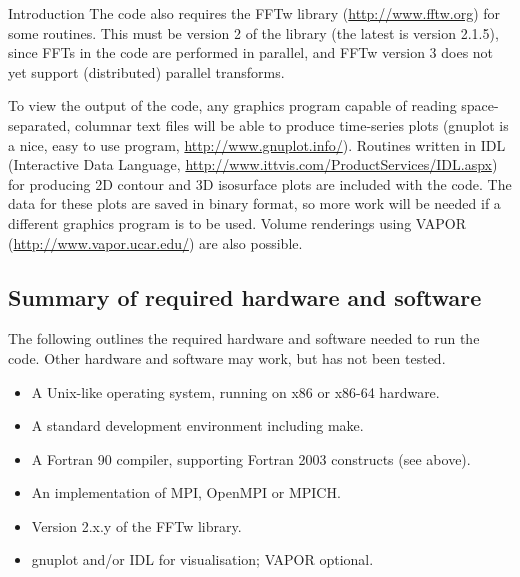 \begin{chapter}{\label{cha:introduction}Introduction}
  The code also requires the FFTw library (\url{http://www.fftw.org}) for some
  routines.  This must be version 2 of the library (the latest is version
  2.1.5), since FFTs in the code are performed in parallel, and FFTw version 3
  does not yet support (distributed) parallel transforms.

  To view the output of the code, any graphics program capable of reading
  space-separated, columnar text files will be able to produce time-series
  plots (gnuplot is a nice, easy to use program,
  \url{http://www.gnuplot.info/}).  Routines written in IDL (Interactive Data
  Language, \url{http://www.ittvis.com/ProductServices/IDL.aspx}) for producing
  2D contour and 3D isosurface plots are included with the code.  The data for
  these plots are saved in binary format, so more work will be needed if a
  different graphics program is to be used.  Volume renderings using VAPOR
  (\url{http://www.vapor.ucar.edu/}) are also possible.

  \subsection{Summary of required hardware and software}
  The following outlines the required hardware and software needed to run the
  code.  Other hardware and software may work, but has not been tested.
  \begin{itemize}
    \item A Unix-like operating system, running on x86 or x86-64 hardware.
    \item A standard development environment including make.
    \item A Fortran 90 compiler, supporting Fortran 2003 constructs (see
      above).
    \item An implementation of MPI, \eg OpenMPI or MPICH.
    \item Version 2.x.y of the FFTw library.
    \item gnuplot and/or IDL for visualisation; VAPOR optional.
  \end{itemize}


\end{chapter}
